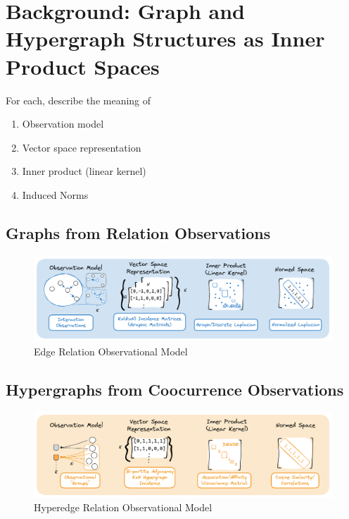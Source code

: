 \documentclass[%
	12pt,
		oneside,
		letterpaper
]{book}
\providecommand{\tightlist}{%
  \setlength{\itemsep}{0pt}\setlength{\parskip}{0pt}}\usepackage{longtable,booktabs,array}
\begin{document}

\chapter{Background: Graph and Hypergraph Structures as Inner Product
Spaces}\label{background-graph-and-hypergraph-structures-as-inner-product-spaces}

For each, describe the meaning of

\begin{enumerate}
\def\labelenumi{\arabic{enumi}.}
\tightlist
\item
  Observation model
\item
  Vector space representation
\item
  Inner product (linear kernel)
\item
  Induced Norms
\end{enumerate}

\section{Graphs from Relation
Observations}\label{graphs-from-relation-observations}

\begin{figure}[H]

{\centering \includegraphics{images/relation-observations.png}

}

\caption{Edge Relation Observational Model}

\end{figure}%

\section{Hypergraphs from Coocurrence
Observations}\label{hypergraphs-from-coocurrence-observations}

\begin{figure}[H]

{\centering \includegraphics{images/hypergraph-observations.png}

}

\caption{Hyperedge Relation Observational Model}

\end{figure}%
\end{document}

